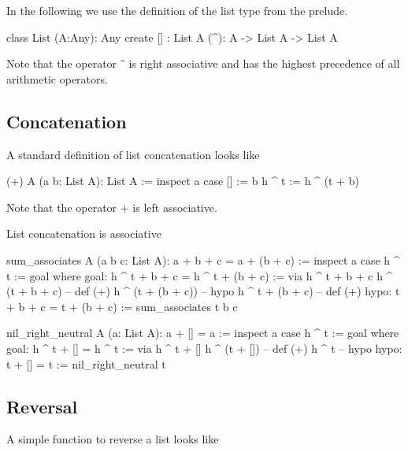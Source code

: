 In the following we use the definition of the list type from the prelude.

\begin{alba}
  class
    List (A:Any): Any
  create
    [] : List A
    (^): A -> List A -> List A
\end{alba}
%
Note that the operator $\mathrel{\hat{\ }}$ is right associative and has the
highest precedence of all arithmetic operators.



\subsection{Concatenation}


A standard definition of list concatenation looks like

\begin{alba}
  (+) A (a b: List A): List A :=
    inspect a case
      [] :=
        b
      h ^ t :=
        h ^ (t + b)
\end{alba}
Note that the operator $+$ is left associative.


List concatenation is associative
%
\begin{alba}
  sum_associates A (a b c: List A): a + b + c = a + (b + c) :=
    inspect a case
      h ^ t :=
        goal where
          goal: h ^ t + b + c = h ^ t + (b + c) :=
            via
               h ^ t + b + c
               h ^ (t + b + c)      -- def (+)
               h ^ (t + (b + c))    -- hypo
               h ^ t + (b + c)      -- def (+)
          hypo: t + b + c = t + (b + c) :=
            sum_associates t b c
\end{alba}


\begin{alba}
  nil_right_neutral A (a: List A): a + [] = a :=
    inspect a case
      h ^ t :=
        goal where
          goal: h ^ t + [] = h ^ t :=
            via
              h ^ t + []
              h ^ (t + [])   -- def (+)
              h ^ t          -- hypo
          hypo: t + [] = t :=
            nil_right_neutral t
\end{alba}





\subsection{Reversal}



A simple function to reverse a list looks like

